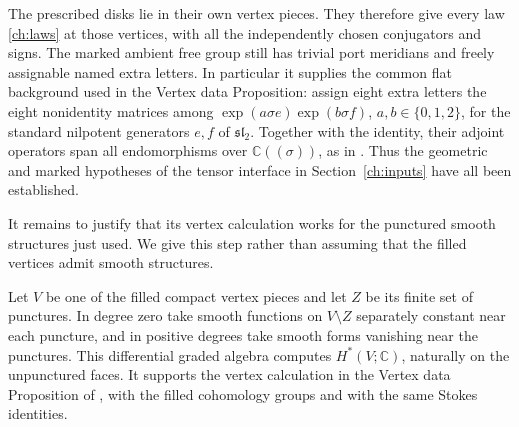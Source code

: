 The prescribed disks lie in their own vertex pieces.  They therefore
give every law \eqref{ch:laws} at those vertices, with all the
independently chosen conjugators and signs.  The marked ambient free
group still has trivial port meridians and freely assignable named
extra letters.  In particular it supplies the common flat background
used in the Vertex data Proposition: assign eight extra letters the
eight nonidentity matrices among
$\exp(a\sigma e)\exp(b\sigma f)$, $a,b\in\{0,1,2\}$, for the
standard nilpotent generators $e,f$ of $\mathfrak{sl}_2$.
Together with the identity, their adjoint operators span all
endomorphisms over $\mathbb C((\sigma))$, as in
\cite[Proposition~6.1]{TO}.
Thus the geometric and marked hypotheses of the tensor interface
in Section~\ref{ch:inputs} have all been established.

It remains to justify that its vertex calculation works for the
punctured smooth structures just used.  We give this step rather
than assuming that the filled vertices admit smooth structures.

\begin{lemma}
\label{ch:puncture-forms}
Let $V$ be one of the filled compact vertex pieces and let $Z$ be
its finite set of punctures.  In degree zero take smooth functions
on $V\setminus Z$ separately constant near each puncture, and in
positive degrees take smooth forms vanishing near the punctures.
This differential graded algebra computes $H^*(V;\mathbb C)$,
naturally on the unpunctured faces.  It supports the vertex
calculation in the Vertex data Proposition of \cite{TO}, with the
filled cohomology groups and with the same Stokes identities.
\end{lemma}

